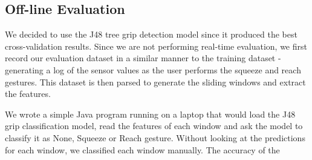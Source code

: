 \subsection{Off-line Evaluation}
We decided to use the J48 tree grip detection model since it produced the best cross-validation results. Since we are not performing real-time evaluation, we first record our evaluation dataset in a similar manner to the training dataset - generating a log of the sensor values as the user performs the squeeze and reach gestures. This dataset is then parsed to generate the sliding windows and extract the features. 
\par
We wrote a simple Java program running on a laptop that would load the J48 grip classification model, read the features of each window and ask the model to classify it as None, Squeeze or Reach gesture. Without looking at the predictions for each window, we classified each window manually. The accuracy of the 
